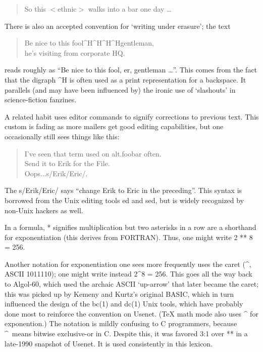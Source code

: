 \begin{quote}
	So this $<$ethnic$>$ walks into a bar one day \dots
\end{quote}

There is also an accepted convention for `writing under erasure'; the text

\begin{quote}
	Be nice to this fool\^{}H\^{}H\^{}H\^{}Hgentleman,\\
	he's visiting from corporate HQ.
\end{quote}

reads roughly as ``Be nice to this fool, er, gentleman \dots''. This comes from the fact that the digraph \^{}H is often used as a print
representation for a backspace. It parallels (and may have been influenced by) the ironic use of `slashouts' in science-fiction fanzines.

A related habit uses editor commands to signify corrections to previous text. This custom is fading as more mailers get good editing
capabilities, but one occasionally still sees things like this:

\begin{quote}
	I've seen that term used on alt.foobar often.\\
	Send it to Erik for the File.\\
	Oops...s/Erik/Eric/.
\end{quote}

The s/Erik/Eric/ says ``change Erik to Eric in the preceding''. This syntax is borrowed from the Unix editing tools ed and sed, but is
widely recognized by non-Unix hackers as well.

In a formula, * signifies multiplication but two asterisks in a row are a shorthand for exponentiation (this derives from FORTRAN). Thus,
one might write 2 ** 8 = 256.

Another notation for exponentiation one sees more frequently uses the caret (\^{}, ASCII 1011110); one might write instead 2\^{}8 = 256.
This goes all the way back to Algol-60, which used the archaic ASCII `up-arrow' that later became the caret; this was picked up by Kemeny
and Kurtz's original BASIC, which in turn influenced the design of the bc(1) and dc(1) Unix tools, which have probably done most to
reinforce the convention on Usenet. (TeX math mode also uses \^{} for exponention.) The notation is mildly confusing to C programmers,
because \^{}\ means bitwise exclusive-or in C. Despite this, it was favored 3:1 over ** in a late-1990 snapshot of Usenet. It is used
consistently in this lexicon.

